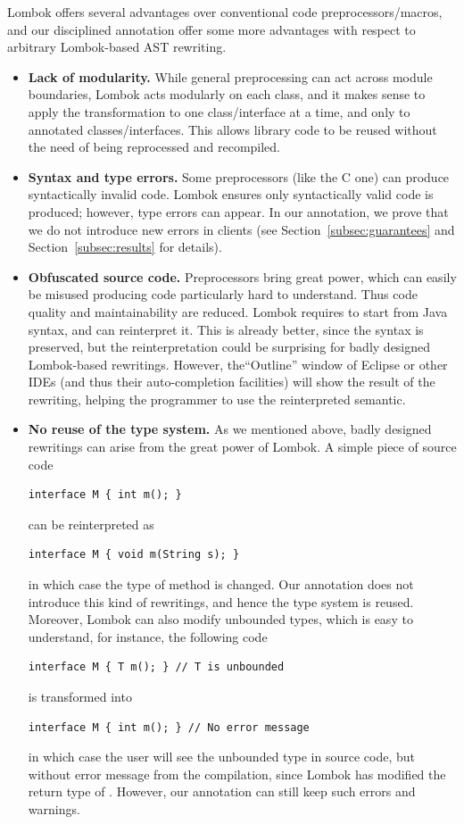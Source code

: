 \noindent
Lombok offers several advantages over conventional code preprocessors/macros,
and our disciplined \mixin annotation offer some more advantages with respect to arbitrary Lombok-based
AST rewriting.
\begin{itemize}
\item \textbf{Lack of modularity.}
While general preprocessing can act across module boundaries, Lombok acts modularly on each class, and it makes
sense to apply the transformation to one class/interface at a time, and only to annotated classes/interfaces.
This allows library code to be reused without the need of being
reprocessed and recompiled.

\item \textbf{Syntax and type errors.}
Some preprocessors (like the C one) can produce syntactically invalid code.
Lombok ensures only syntactically valid code is produced; however, type errors can appear.
In our annotation, we prove that we do not introduce new errors in clients (see Section~\ref{subsec:guarantees} and Section~\ref{subsec:results} for details).

\item \textbf{Obfuscated source code.}
Preprocessors bring great power, which can easily be misused producing
code particularly hard to understand. Thus code quality and maintainability are reduced.
Lombok requires to start from Java syntax, and can reinterpret it.
This is already better, since the syntax is preserved, but the reinterpretation could be surprising for
badly designed Lombok-based rewritings.
However, the``Outline'' window of Eclipse or other IDEs (and thus their auto-completion facilities)
will show the result of the rewriting, helping the programmer to use the reinterpreted semantic.

\item \textbf{No reuse of the type system.}
As we mentioned above, badly designed rewritings can arise from the great power of Lombok. A simple piece of source code
\begin{lstlisting}
interface M { int m(); }
\end{lstlisting}
can be reinterpreted as
\begin{lstlisting}
interface M { void m(String s); }
\end{lstlisting}
in which case the type of method \Q@m@ is changed. Our \mixin annotation does not introduce this kind of rewritings,
and hence the type system is reused. Moreover, Lombok can also modify unbounded types, which is easy to understand,
for instance, the following code
\begin{lstlisting}
interface M { T m(); } // T is unbounded
\end{lstlisting}
is transformed into
\begin{lstlisting}
interface M { int m(); } // No error message
\end{lstlisting}
in which case the user will see the unbounded type in source code, but without error message from the compilation, since
Lombok has modified the return type of \Q@m@. However, our \mixin annotation can still keep such errors and warnings.


\end{itemize}
